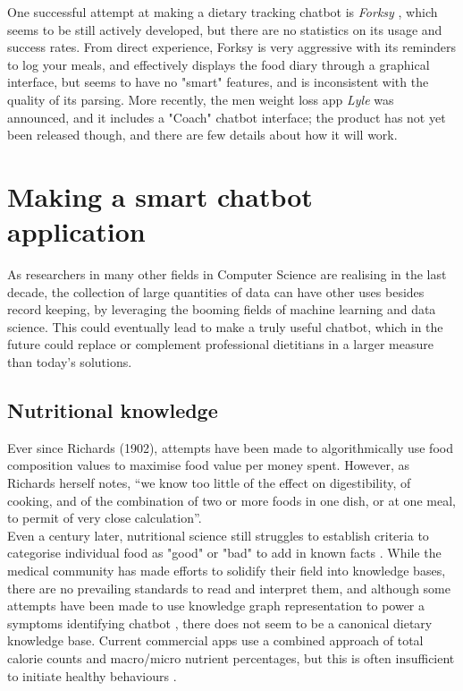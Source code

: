 One successful attempt at making a dietary tracking chatbot is \textit{Forksy} \cite{forksywebsite}, which seems to be still actively developed, but there are no statistics on its usage and success rates. From direct experience, Forksy is very aggressive with its reminders to log your meals, and effectively displays the food diary through a graphical interface, but seems to have no "smart" features, and is inconsistent with the quality of its parsing. More recently, the men weight loss app \textit{Lyle} \cite{lyle} was announced, and it includes a "Coach" chatbot interface; the product has not yet been released though, and there are few details about how it will work.
\section{Making a smart chatbot application}
As researchers in many other fields in Computer Science are realising in the last decade, the collection of large quantities of data can have other uses besides record keeping, by leveraging the booming fields of machine learning and data science. This could eventually lead to make a truly useful chatbot, which in the future could replace or complement professional dietitians in a larger measure than today's solutions. 
\subsection{Nutritional knowledge}
Ever since Richards (1902)\cite{Richards1902a}, attempts have been made to algorithmically use food composition values to maximise food value per money spent. However, as Richards herself notes, ``we know too little of the effect on digestibility, of cooking, and of the combination of two or more foods in one dish, or at one meal, to permit of very close calculation''. \\
Even a century later, nutritional science still struggles to establish criteria to categorise individual food as "good" or "bad" to add in known facts \cite{Chen2012}. While the medical community has made efforts to solidify their field into knowledge bases, there are no prevailing standards to read and interpret them, and although some attempts have been made to use knowledge graph representation to power a symptoms identifying chatbot \cite{minutoloa2017conversational}, there does not seem to be a canonical dietary knowledge base. Current commercial apps use a combined approach of total calorie counts and macro/micro nutrient percentages, but this is often insufficient to initiate healthy behaviours \cite{Davis2016}.

